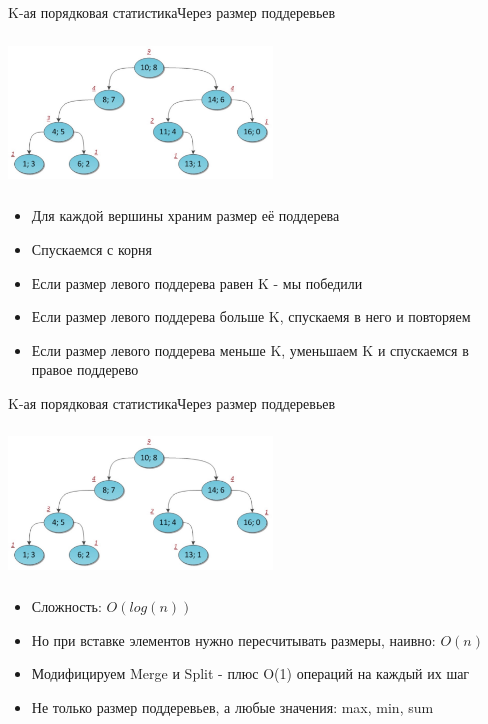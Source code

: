 \documentclass[10pt]{beamer}
\begin{document}
\begin{frame}[fragile]{K-ая порядковая статистика}{Через размер поддеревьев}
\begin{center}
\includegraphics[width=7cm, height=4cm]{Term_1/Source/Pirctures/treap_subtrees.jpg}\\
\end{center}
\begin{itemize}
    \item Для каждой вершины храним размер её поддерева
    \item Спускаемся с корня
    \item Если размер левого поддерева равен K - мы победили
    \item Если размер левого поддерева больше K, спускаемя в него и повторяем
    \item Если размер левого поддерева меньше K, уменьшаем K и спускаемся в правое поддерево
\end{itemize}
\end{frame}

\begin{frame}[fragile]{K-ая порядковая статистика}{Через размер поддеревьев}
\begin{center}
\includegraphics[width=7cm, height=4cm]{Term_1/Source/Pirctures/treap_subtrees.jpg}\\
\end{center}
\begin{itemize}
    \item Сложность: $O(log(n))$
    \item Но при вставке элементов нужно пересчитывать размеры, наивно: $O(n)$
    \item Модифицируем Merge и Split - плюс O(1) операций на каждый их шаг
    \item Не только размер поддеревьев, а любые значения: max, min, sum
\end{itemize}
\end{frame}
\end{document}
